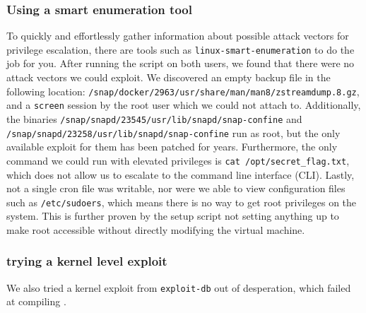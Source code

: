 \documentclass[a4paper]{article}
\begin{document}
\subsubsection{Using a smart enumeration tool}
To quickly and effortlessly gather information about possible attack vectors for privilege escalation, there are tools such as \texttt{linux-smart-enumeration} to do the job for you. After running the script on both users, we found that there were no attack vectors we could exploit. We discovered an empty backup file in the following location: \texttt{/snap/docker/2963/usr/share/man/man8/zstreamdump.8.gz}, and a \texttt{screen} session by the root user which we could not attach to. Additionally, the binaries \texttt{/snap/snapd/23545/usr/lib/snapd/snap-confine} and \texttt{/snap/snapd/23258/usr/lib/snapd/snap-confine} run as root, but the only available exploit for them has been patched for years. Furthermore, the only command we could run with elevated privileges is \texttt{cat /opt/secret\_flag.txt}, which does not allow us to escalate to the command line interface (CLI). Lastly, not a single cron file was writable, nor were we able to view configuration files such as \texttt{/etc/sudoers}, which means there is no way to get root privileges on the system. This is further proven by the setup script not setting anything up to make root accessible without directly modifying the virtual machine.\cite{lse,suid,sudo-exploit,enumeration-walkthough}
\subsubsection{trying a kernel level exploit}
We also tried a kernel exploit from \texttt{exploit-db} out of desperation, which failed at compiling \cite{exploitdb}.
\end{document}
